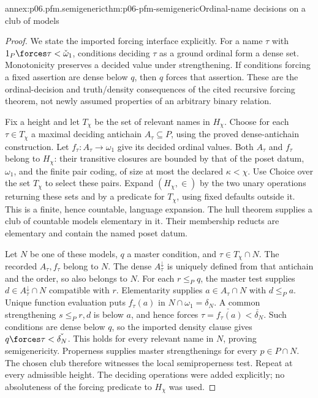 \begin{annexitem}{annex:p06.pfm.semigeneric}{thm:p06-pfm-semigeneric}{Ordinal-name decisions on a club of models}
\begin{proof}
We state the imported forcing interface explicitly.
For a name \(\tau\) with \(1_P\forces\tau<\check\omega_1\),
conditions deciding \(\tau\) as a ground ordinal form a dense set.
Monotonicity preserves a decided value under strengthening.
If conditions forcing a fixed assertion are dense below \(q\), then
\(q\) forces that assertion. These are the ordinal-decision and
truth/density consequences of the cited recursive forcing theorem,
not newly assumed properties of an arbitrary binary relation.

Fix a height and let \(T_\chi\) be the set of relevant names in \(H_\chi\).
Choose for each \(\tau\in T_\chi\) a maximal deciding antichain
\(A_\tau\subseteq P\), using the proved dense-antichain construction.
Let \(f_\tau:A_\tau\to\omega_1\) give its decided ordinal values.
Both \(A_\tau\) and \(f_\tau\) belong to \(H_\chi\):
their transitive closures are bounded by that of the poset datum,
\(\omega_1\), and the finite pair coding, of size at most the declared
\(\kappa<\chi\).
Use Choice over the set \(T_\chi\) to select these pairs.
Expand \((H_\chi,\in)\) by the two unary operations returning these sets
and by a predicate for \(T_\chi\), using fixed defaults outside it.
This is a finite, hence countable, language expansion.
The hull theorem supplies a club of countable models elementary in it.
Their membership reducts are elementary and contain the named poset datum.

Let \(N\) be one of these models, \(q\) a master condition, and
\(\tau\in T_\chi\cap N\).
The recorded \(A_\tau,f_\tau\) belong to \(N\).
The dense \(A_\tau^\downarrow\) is uniquely defined from that antichain
and the order, so also belongs to \(N\).
For each \(r\leq_P q\), the master test supplies
\(d\in A_\tau^\downarrow\cap N\) compatible with \(r\).
Elementarity supplies \(a\in A_\tau\cap N\) with \(d\leq_P a\).
Unique function evaluation puts \(f_\tau(a)\) in \(N\cap\omega_1=\delta_N\).
A common strengthening \(s\leq_P r,d\) is below \(a\), and hence forces
\(\tau=\check{f_\tau(a)}<\check{\delta_N}\).
Such conditions are dense below \(q\), so the imported density clause
gives \(q\forces\tau<\check{\delta_N}\).
This holds for every relevant name in \(N\), proving semigenericity.
Properness supplies master strengthenings for every \(p\in P\cap N\).
The chosen club therefore witnesses the local semiproperness test.
Repeat at every admissible height.
The deciding operations were added explicitly; no absoluteness of the
forcing predicate to \(H_\chi\) was used.
\end{proof}
\end{annexitem}

